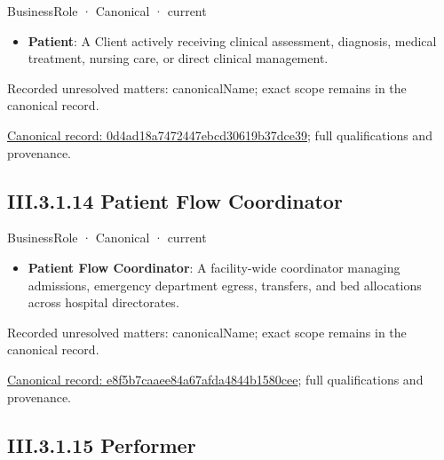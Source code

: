 \label{element:0d4ad18a7472447ebcd30619b37dce39}
{\small BusinessRole · Canonical · current}\par

\begin{itemize}


\item \textbf{Patient}: A Client actively receiving clinical assessment, diagnosis, medical treatment, nursing care, or direct clinical management.

\end{itemize}

{\small Recorded unresolved matters: canonicalName; exact scope remains in the canonical record.}\par
{\footnotesize \href{../../../../continuum/business/business-role/0d4ad18a7472447ebcd30619b37dce39.md}{Canonical record: 0d4ad18a7472447ebcd30619b37dce39}; full qualifications and provenance.}\par
\subsection*{III.3.1.14 Patient Flow Coordinator}
\label{navigation:III.3.1.14}

\label{element:e8f5b7caaee84a67afda4844b1580cee}
{\small BusinessRole · Canonical · current}\par

\begin{itemize}


\item \textbf{Patient Flow Coordinator}: A facility-wide coordinator managing admissions, emergency department egress, transfers, and bed allocations across hospital directorates.

\end{itemize}

{\small Recorded unresolved matters: canonicalName; exact scope remains in the canonical record.}\par
{\footnotesize \href{../../../../continuum/business/business-role/e8f5b7caaee84a67afda4844b1580cee.md}{Canonical record: e8f5b7caaee84a67afda4844b1580cee}; full qualifications and provenance.}\par
\subsection*{III.3.1.15 Performer}
\label{navigation:III.3.1.15}

